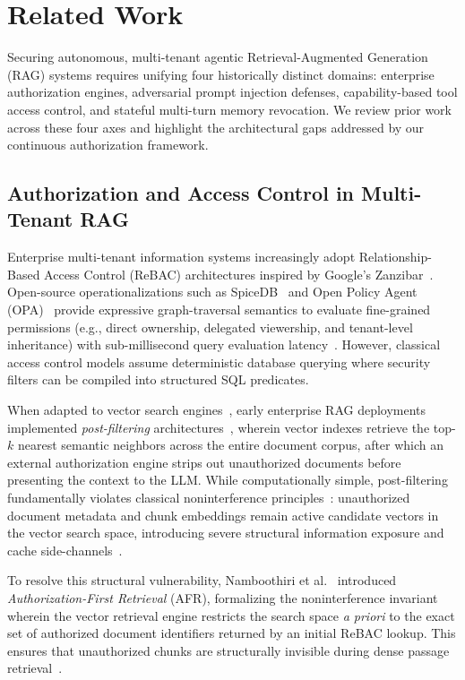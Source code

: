 \section{Related Work}
\label{sec:related_work}

Securing autonomous, multi-tenant agentic Retrieval-Augmented Generation (RAG) systems requires unifying four historically distinct domains: enterprise authorization engines, adversarial prompt injection defenses, capability-based tool access control, and stateful multi-turn memory revocation. We review prior work across these four axes and highlight the architectural gaps addressed by our continuous authorization framework.

\subsection{Authorization and Access Control in Multi-Tenant RAG}
\label{sec:rel_rag_authz}

Enterprise multi-tenant information systems increasingly adopt Relationship-Based Access Control (ReBAC) architectures inspired by Google's Zanzibar~\cite{pang2019zanzibar}. Open-source operationalizations such as SpiceDB~\cite{authzed2023spicedb} and Open Policy Agent (OPA)~\cite{styra2022opa} provide expressive graph-traversal semantics to evaluate fine-grained permissions (e.g., direct ownership, delegated viewership, and tenant-level inheritance) with sub-millisecond query evaluation latency~\cite{rebacenterprise2024, authzbench2025}. However, classical access control models assume deterministic database querying where security filters can be compiled into structured SQL predicates.

When adapted to vector search engines~\cite{qdrant2023, lewis2020rag}, early enterprise RAG deployments implemented \textit{post-filtering} architectures~\cite{jeong2025permission}, wherein vector indexes retrieve the top-$k$ nearest semantic neighbors across the entire document corpus, after which an external authorization engine strips out unauthorized documents before presenting the context to the LLM. While computationally simple, post-filtering fundamentally violates classical noninterference principles~\cite{rushby1982noninterference, saltzer1975protection}: unauthorized document metadata and chunk embeddings remain active candidate vectors in the vector search space, introducing severe structural information exposure and cache side-channels~\cite{multitenantrag2025, authzrag2026}.

To resolve this structural vulnerability, Namboothiri et al.~\cite{namboothiri2026afr} introduced \textit{Authorization-First Retrieval} (AFR), formalizing the noninterference invariant wherein the vector retrieval engine restricts the search space \textit{a priori} to the exact set of authorized document identifiers returned by an initial ReBAC lookup. This ensures that unauthorized chunks are structurally invisible during dense passage retrieval~\cite{karpukhin2020dpr}.

